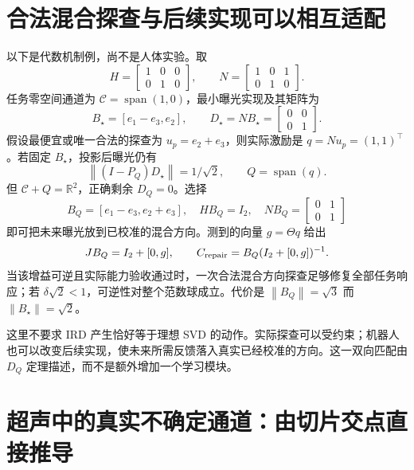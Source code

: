 \documentclass[11pt,a4paper]{article}
\numberwithin{equation}{section}
\theoremstyle{definition}
\newcommand{\R}{\mathbb R}
\newcommand{\norm}[1]{\left\lVert#1\right\rVert}
\begin{document}
\section{合法混合探查与后续实现可以相互适配}
以下是代数机制例，尚不是人体实验。取
\begin{equation}
 H=\begin{bmatrix}1&0&0\\0&1&0\end{bmatrix},\qquad
 N=\begin{bmatrix}1&0&1\\0&1&0\end{bmatrix}.
\end{equation}
任务零空间通道为 $\mathcal C=\operatorname{span}(1,0)$，最小曝光实现及其矩阵为
\begin{equation}
 B_\star=[e_1-e_3,e_2],\qquad
 D_\star=NB_\star=\begin{bmatrix}0&0\\0&1\end{bmatrix}.
\end{equation}
假设最便宜或唯一合法的探查为 $u_p=e_2+e_3$，则实际激励是 $q=Nu_p=(1,1)^\top$。若固定 $B_\star$，投影后曝光仍有
\begin{equation}
 \norm{(I-P_Q)D_\star}=1/\sqrt2,
 \qquad Q=\operatorname{span}(q).
\end{equation}
但 $\mathcal C+Q=\R^2$，正确剩余 $D_Q=0$。选择
\begin{equation}
 B_Q=[e_1-e_3,e_2+e_3],\quad
 HB_Q=I_2,\quad NB_Q=\begin{bmatrix}0&1\\0&1\end{bmatrix}
\end{equation}
即可把未来曝光放到已校准的混合方向。测到的向量 $g=\Theta q$ 给出
\begin{equation}
 JB_Q=I_2+[0,g],\qquad
 C_{\rm repair}=B_Q(I_2+[0,g])^{-1}.
\end{equation}
当该增益可逆且实际能力验收通过时，一次合法混合方向探查足够修复全部任务响应；若 $\delta\sqrt2<1$，可逆性对整个范数球成立。代价是 $\norm{B_Q}=\sqrt3$ 而 $\norm{B_\star}=\sqrt2$。

这里不要求 IRD 产生恰好等于理想 SVD 的动作。实际探查可以受约束；机器人也可以改变后续实现，使未来所需反馈落入真实已经校准的方向。这一双向匹配由 $D_Q$ 定理描述，而不是额外增加一个学习模块。

\section{超声中的真实不确定通道：由切片交点直接推导}
\end{document}
